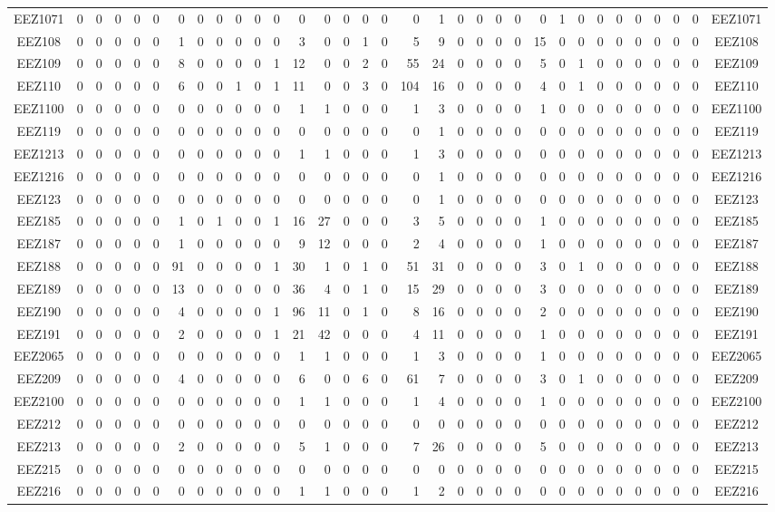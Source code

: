 \documentclass[10pt,a4paper,twoside]{report}
\begin{document}
{\begin{tabular}{crrrrrrrrrrrrrrrrrrrrrrrrrrrrrrrc}
EEZ1071&0&0&0&0&0&0&0&0&0&0&0&0&0&0&0&0&0&1&0&0&0&0&0&1&0&0&0&0&0&0&0&EEZ1071\\
EEZ108&0&0&0&0&0&1&0&0&0&0&0&3&0&0&1&0&5&9&0&0&0&0&15&0&0&0&0&0&0&0&0&EEZ108\\
EEZ109&0&0&0&0&0&8&0&0&0&0&1&12&0&0&2&0&55&24&0&0&0&0&5&0&1&0&0&0&0&0&0&EEZ109\\
EEZ110&0&0&0&0&0&6&0&0&1&0&1&11&0&0&3&0&104&16&0&0&0&0&4&0&1&0&0&0&0&0&0&EEZ110\\
EEZ1100&0&0&0&0&0&0&0&0&0&0&0&1&1&0&0&0&1&3&0&0&0&0&1&0&0&0&0&0&0&0&0&EEZ1100\\
EEZ119&0&0&0&0&0&0&0&0&0&0&0&0&0&0&0&0&0&1&0&0&0&0&0&0&0&0&0&0&0&0&0&EEZ119\\
EEZ1213&0&0&0&0&0&0&0&0&0&0&0&1&1&0&0&0&1&3&0&0&0&0&0&0&0&0&0&0&0&0&0&EEZ1213\\
EEZ1216&0&0&0&0&0&0&0&0&0&0&0&0&0&0&0&0&0&1&0&0&0&0&0&0&0&0&0&0&0&0&0&EEZ1216\\
EEZ123&0&0&0&0&0&0&0&0&0&0&0&0&0&0&0&0&0&1&0&0&0&0&0&0&0&0&0&0&0&0&0&EEZ123\\
EEZ185&0&0&0&0&0&1&0&1&0&0&1&16&27&0&0&0&3&5&0&0&0&0&1&0&0&0&0&0&0&0&0&EEZ185\\
EEZ187&0&0&0&0&0&1&0&0&0&0&0&9&12&0&0&0&2&4&0&0&0&0&1&0&0&0&0&0&0&0&0&EEZ187\\
EEZ188&0&0&0&0&0&91&0&0&0&0&1&30&1&0&1&0&51&31&0&0&0&0&3&0&1&0&0&0&0&0&0&EEZ188\\
EEZ189&0&0&0&0&0&13&0&0&0&0&0&36&4&0&1&0&15&29&0&0&0&0&3&0&0&0&0&0&0&0&0&EEZ189\\
EEZ190&0&0&0&0&0&4&0&0&0&0&1&96&11&0&1&0&8&16&0&0&0&0&2&0&0&0&0&0&0&0&0&EEZ190\\
EEZ191&0&0&0&0&0&2&0&0&0&0&1&21&42&0&0&0&4&11&0&0&0&0&1&0&0&0&0&0&0&0&0&EEZ191\\
EEZ2065&0&0&0&0&0&0&0&0&0&0&0&1&1&0&0&0&1&3&0&0&0&0&1&0&0&0&0&0&0&0&0&EEZ2065\\
EEZ209&0&0&0&0&0&4&0&0&0&0&0&6&0&0&6&0&61&7&0&0&0&0&3&0&1&0&0&0&0&0&0&EEZ209\\
EEZ2100&0&0&0&0&0&0&0&0&0&0&0&1&1&0&0&0&1&4&0&0&0&0&1&0&0&0&0&0&0&0&0&EEZ2100\\
EEZ212&0&0&0&0&0&0&0&0&0&0&0&0&0&0&0&0&0&0&0&0&0&0&0&0&0&0&0&0&0&0&0&EEZ212\\
EEZ213&0&0&0&0&0&2&0&0&0&0&0&5&1&0&0&0&7&26&0&0&0&0&5&0&0&0&0&0&0&0&0&EEZ213\\
EEZ215&0&0&0&0&0&0&0&0&0&0&0&0&0&0&0&0&0&0&0&0&0&0&0&0&0&0&0&0&0&0&0&EEZ215\\
EEZ216&0&0&0&0&0&0&0&0&0&0&0&1&1&0&0&0&1&2&0&0&0&0&0&0&0&0&0&0&0&0&0&EEZ216\\

\end{tabular}}
\end{document}
